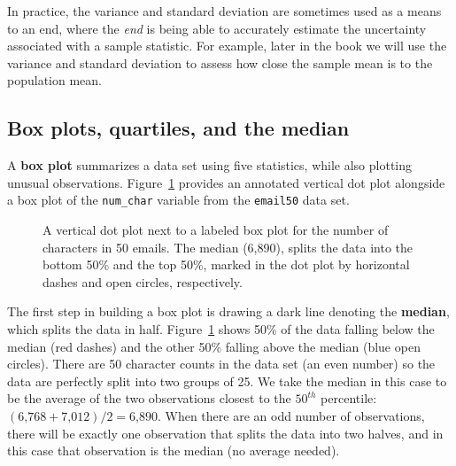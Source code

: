 \documentclass[
  letterpaper,
  DIV=11,
  numbers=noendperiod]{scrreprt}
\begin{document}
In practice, the variance and standard deviation are sometimes used as a
means to an end, where the \emph{end} is being able to accurately
estimate the uncertainty associated with a sample statistic. For
example, later in the book we will use the variance and standard
deviation to assess how close the sample mean is to the population mean.

\subsection{Box plots, quartiles, and the
median}\label{box-plots-quartiles-and-the-median}

A \textbf{box plot} summarizes a data set using five statistics, while
also plotting unusual observations. Figure~\ref{fig-box} provides an
annotated vertical dot plot alongside a box plot of the
\texttt{num\_char} variable from the \texttt{email50} data set.

\begin{figure}


\caption{\label{fig-box}A vertical dot plot next to a labeled box plot
for the number of characters in 50 emails. The median (6,890), splits
the data into the bottom 50\% and the top 50\%, marked in the dot plot
by horizontal dashes and open circles, respectively.}

\end{figure}%

The first step in building a box plot is drawing a dark line denoting
the \textbf{median}, which splits the data in half. Figure~\ref{fig-box}
shows 50\% of the data falling below the median (red dashes) and the
other 50\% falling above the median (blue open circles). There are 50
character counts in the data set (an even number) so the data are
perfectly split into two groups of 25. We take the median in this case
to be the average of the two observations closest to the \(50^{th}\)
percentile: \((\text{6,768} + \text{7,012}) / 2 = \text{6,890}\). When
there are an odd number of observations, there will be exactly one
observation that splits the data into two halves, and in this case that
observation is the median (no average needed).
\end{document}

